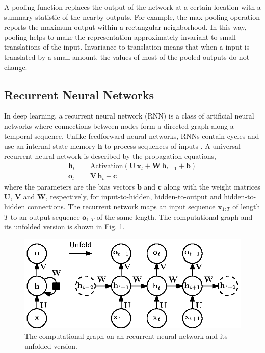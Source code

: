 \documentclass{scrartcl}
\begin{document}
A pooling function replaces the output of the network at a certain location with a summary statistic of the nearby outputs. For example, the max pooling \cite{Zhou1988} operation reports the maximum output within a rectangular neighborhood. In this way, pooling helps to make the representation approximately invariant to small translations of the input. Invariance to translation means that when a input is translated by a small amount, the values of most of the pooled outputs do not change.




\subsection{Recurrent Neural Networks}

In deep learning, a recurrent neural network (RNN) \cite{Rumelhart1988} is a class of artificial neural networks where connections between nodes form a directed graph along a temporal sequence. Unlike feedforward neural networks, RNNs contain cycles and use an internal state memory $\mathbf h$ to process sequences of inputs \cite{Elman1990}. A universal recurrent neural network is described by the propagation equations,
\begin{align}
\mathbf h_t &= \text{Activation}(\mathbf U \,\mathbf x_t + \mathbf W \, \mathbf h_{t-1} + \mathbf b) \\
\mathbf o_t &= \mathbf V \, \mathbf h_t + \mathbf c 
\end{align} 
where the parameters are the bias vectors $\mathbf b$ and $\mathbf c$ along with the weight matrices $\mathbf U$, $\mathbf V$ and $\mathbf W$, respectively, for input-to-hidden, hidden-to-output and hidden-to-hidden connections. The recurrent network maps an input sequence $\mathbf x_{1:T}$ of length $T$ to an output sequence $\mathbf o_{1:T}$ of the same length. The computational graph and its unfolded version is shown in Fig. \ref{fig:rnn}.
\begin{figure}[htbp]
\centering
\includegraphics[scale=1]{figures/rnn.eps}
\caption{The computational graph on an recurrent neural network and its unfolded version.}
\label{fig:rnn}
\end{figure}    
\end{document}
